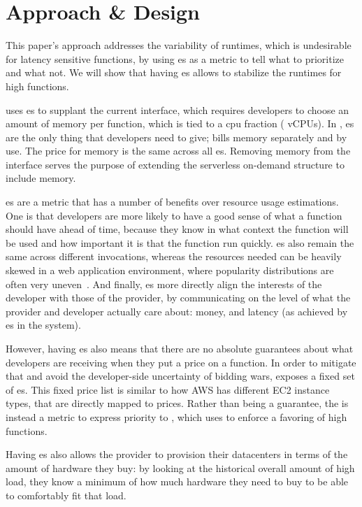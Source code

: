 \section{Approach \& Design}\label{design}

This paper's approach addresses the variability of runtimes, which is
undesirable for latency sensitive functions, by using \priceclass{}es as a
metric to tell \sys{} what to prioritize and what not. We will show that having
\priceclass{}es allows \sys{} to stabilize the runtimes for high \class{}
functions. 

\Sys{} uses \class{}es to supplant the current interface, which requires
developers to choose an amount of memory per function, which is tied to a cpu
fraction ( vCPUs). In \sys{}, \priceclass{}es are the only thing
that developers need to give; \sys{} bills memory separately and by use. The
price for memory is the same across all \class{}es. Removing memory from the
interface serves the purpose of extending the serverless on-demand structure to
include memory.

\Priceclass{}es are a metric that has a number of benefits over resource usage
estimations. One is that developers are more likely to have a good sense of what
\priceclass{} a function should have ahead of time, because they know in what
context the function will be used and how important it is that the function run
quickly. \Priceclass{}es also remain the same across different invocations,
whereas the resources needed can be heavily skewed in a web application
environment, where popularity distributions are often very
uneven~\cite{hermod,serverless-in-the-wild}. And finally, \class{}es more
directly align the interests of the developer with those of the provider, by
communicating on the level of what the provider and developer actually care
about: money, and latency (as achieved by \class{}es in the system).

However, having \priceclass{}es also means that there are no absolute guarantees
about what developers are receiving when they put a price on a function. In
order to mitigate that and avoid the developer-side uncertainty of bidding wars,
\sys{} exposes a fixed set of \priceclass{}es. This fixed price list is similar
to how AWS has different EC2 instance types, that are directly mapped to prices.
Rather than being a guarantee, the \priceclass{} is instead a metric to express
priority to \sys{}, which \sys{} uses to enforce a favoring of high \class{}
functions.

Having \priceclass{}es also allows the provider to provision their datacenters
in terms of the amount of hardware they buy: by looking at the historical
overall amount of high \priceclass{} load, they know a minimum of how much
hardware they need to buy to be able to comfortably fit that load.


